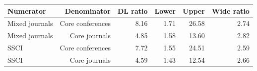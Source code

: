 \begin{tabular}{@{}lrrrrr@{}}
\toprule
Numerator & Denominator & DL ratio & Lower & Upper & Wide ratio \\
\midrule
Mixed journals & Core conferences & 8.16 & 1.71 & 26.58 & 2.74 \\
Mixed journals & Core journals & 4.85 & 1.58 & 13.60 & 2.82 \\
SSCI & Core conferences & 7.72 & 1.55 & 24.51 & 2.59 \\
SSCI & Core journals & 4.59 & 1.43 & 12.54 & 2.66 \\
\bottomrule
\end{tabular}
